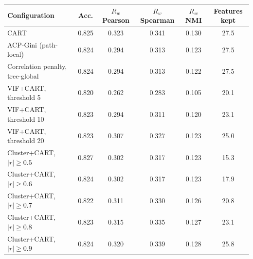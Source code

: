 \begin{tabular}{lccccc}
\toprule
Configuration & Acc. & $R_w$ Pearson & $R_w$ Spearman & $R_w$ NMI & Features kept \\
\midrule
CART & 0.825 & 0.323 & 0.341 & 0.130 & 27.5 \\
ACP-Gini (path-local) & 0.824 & 0.294 & 0.313 & 0.123 & 27.5 \\
Correlation penalty, tree-global & 0.824 & 0.294 & 0.313 & 0.122 & 27.5 \\
VIF+CART, threshold 5 & 0.820 & 0.262 & 0.283 & 0.105 & 20.1 \\
VIF+CART, threshold 10 & 0.823 & 0.294 & 0.311 & 0.120 & 23.1 \\
VIF+CART, threshold 20 & 0.823 & 0.307 & 0.327 & 0.123 & 25.0 \\
Cluster+CART, $|r|\ge0.5$ & 0.827 & 0.302 & 0.317 & 0.123 & 15.3 \\
Cluster+CART, $|r|\ge0.6$ & 0.824 & 0.302 & 0.317 & 0.123 & 17.9 \\
Cluster+CART, $|r|\ge0.7$ & 0.822 & 0.311 & 0.330 & 0.126 & 20.8 \\
Cluster+CART, $|r|\ge0.8$ & 0.823 & 0.315 & 0.335 & 0.127 & 23.1 \\
Cluster+CART, $|r|\ge0.9$ & 0.824 & 0.320 & 0.339 & 0.128 & 25.8 \\
\bottomrule
\end{tabular}
